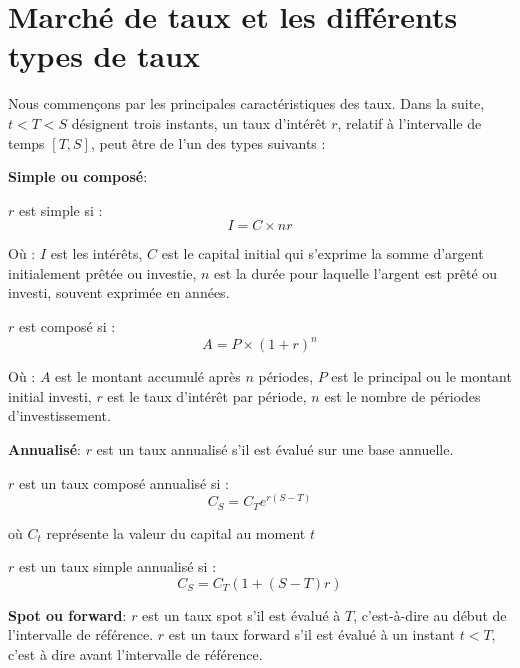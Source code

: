 \chapter{Marché de taux et les différents types de taux} %


Nous commençons par les principales caractéristiques des taux. Dans la suite, \( t < T < S \) désignent trois instants, un taux d'intérêt \( r \), relatif à l'intervalle de temps \([T,S]\), peut être de l'un des types suivants :

\textbf{Simple ou composé}:

\( r \) est simple si : 
\begin{equation}
I = C \times nr
\end{equation}

Où : 
\( I \) est les intérêts,
\( C \) est le capital initial qui s'exprime la somme d'argent initialement prêtée ou investie,
\( n \) est la durée pour laquelle l'argent est prêté ou investi, souvent exprimée en années.

\( r \) est composé si : 
\begin{equation}
A = P \times (1 + r)^n
\end{equation}

Où :
\( A \) est le montant accumulé après \( n \) périodes,
\( P \) est le principal ou le montant initial investi,
\( r \) est le taux d'intérêt par période,
\( n \) est le nombre de périodes d'investissement.

\textbf{Annualisé}:
\( r \) est un taux annualisé s'il est évalué sur une base annuelle.

\( r \) est un taux composé annualisé si : 
\begin{equation}
C_S = C_T e^{r(S-T)}
\end{equation}

où \( C_t \) représente la valeur du capital au moment \( t \)

\( r \) est un taux simple annualisé si : 
\begin{equation}
C_S = C_T(1 + (S - T)r)
\end{equation}

\textbf{Spot ou forward}:
\( r \) est un taux spot s'il est évalué à \( T \), c'est-à-dire au début de l'intervalle de référence.
\( r \) est un taux forward s'il est évalué à un instant \( t < T \), c'est à dire avant l'intervalle de référence.

